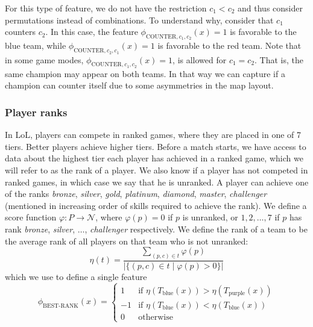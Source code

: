For this type of feature, we do not have the restriction $c_1 < c_2$ and thus consider permutations instead of combinations.
To understand why, consider that $c_1$ counters $c_2$.
In this case, the feature $\phi_{\text{COUNTER},c_1,c_2}(x) = 1$ is favorable to the blue team, while $\phi_{\text{COUNTER},c_2,c_1}(x) = 1$ is favorable to the red team.
Note that in some game modes, $\phi_{\text{COUNTER},c_1,c_2}(x) = 1$, is allowed for $c_1 = c_2$. That is, the same champion may appear on both teams.
In that way we can capture if a champion can counter itself due to some asymmetries in the map layout.

\subsubsection{Player ranks}
In LoL, players can compete in ranked games, where they are placed in one of 7 tiers. Better players achieve higher tiers.
Before a match starts, we have access to data about the highest tier each player has achieved in a ranked game, which we will refer to as the rank of a player. We also know if a player has not competed in ranked games, in which case we say that he is unranked.
A player can achieve one of the ranks \textit{bronze}, \textit{silver}, \textit{gold}, \textit{platinum}, \textit{diamond}, \textit{master}, \textit{challenger} (mentioned in increasing order of skills required to achieve the rank).
We define a score function $\varphi : P \rightarrow \mathcal{N}$, where $\varphi(p) = 0$ if $p$ is unranked, or $1, 2, \dots, 7$ if $p$ has rank \textit{bronze}, \textit{silver}, $\dots$, \textit{challenger} respectively.
We define the rank of a team to be the average rank of all players on that team who is not unranked:
\begin{equation}\label{eq:eta}
\eta(t) = \frac{\sum\limits_{(p, c) \in t} \varphi(p)}{|\{(p, c) \in t \mid \varphi(p) > 0\}|}
\end{equation}
which we use to define a single feature
\begin{equation}\label{eq:bestrank}
\phi_\text{BEST-RANK}(x) = 
\begin{cases} 
  1 & \text{if } \eta(T_\text{blue}(x)) > \eta(T_\text{purple}(x))\\
  -1 & \text{if } \eta(T_\text{blue}(x)) < \eta(T_\text{blue}(x))\\
  0 & \text{otherwise} 
\end{cases}  
\end{equation}

